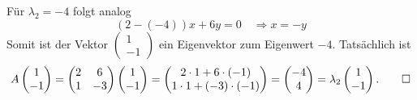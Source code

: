 \begin{loesung}
Für $\lambda_2=-4$ folgt analog
\[
(2-(-4))x+6y=0\quad\Rightarrow x=-y
\]
Somit ist der Vektor
$\begin{pmatrix}1\\-1\end{pmatrix}$
ein Eigenvektor zum Eigenwert $-4$. Tatsächlich ist
\[
A
\begin{pmatrix}1\\-1\end{pmatrix}
=
\begin{pmatrix}
2&6\\
1&-3
\end{pmatrix}
\begin{pmatrix}1\\-1\end{pmatrix}
=
\begin{pmatrix}
2\cdot 1 +6\cdot(-1)\\
1\cdot1+(-3)\cdot(-1)
\end{pmatrix}
=
\begin{pmatrix}
-4\\
4
\end{pmatrix}
=\lambda_2
\begin{pmatrix}1\\-1\end{pmatrix}.
\qedhere
\]
\end{loesung}

